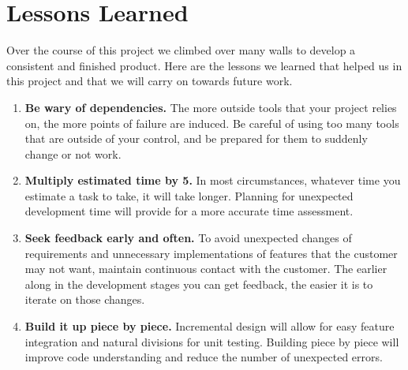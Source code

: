 \chapter{Lessons Learned}

Over the course of this project we climbed over many walls to develop a consistent and finished product. Here are the lessons we learned that helped us in this project and that we will carry on towards future work.

\begin{enumerate}
	\item \textbf{Be wary of dependencies.} The more outside tools that your project relies on, the more points of failure are induced. Be careful  of using too many tools that are outside of your control, and be prepared for them to suddenly change or not work.
	\item \textbf{Multiply estimated time by 5.} In most circumstances, whatever time you estimate a task to take, it will take longer. Planning for unexpected development time will provide for a more accurate time assessment. 
	\item \textbf{Seek feedback early and often.} To avoid unexpected changes of requirements and unnecessary implementations of features that the customer may not want, maintain continuous contact with the customer. The earlier along in the development stages you can get feedback, the easier it is to iterate on those changes.
	\item \textbf{Build it up piece by piece.} Incremental design will allow for easy feature integration and natural divisions for unit testing. Building piece by piece will improve code understanding and reduce the number of unexpected errors.
\end{enumerate}
